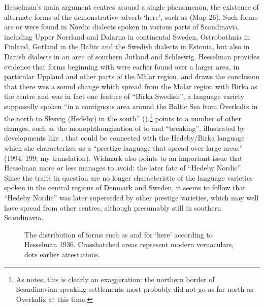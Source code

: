 Hesselman’s main argument centres around a single phenomenon, the existence of alternate forms of the demonstrative adverb  ‘here’, such as  (Map 26). Such forms are or were found in Nordic dialects spoken in various parts of Scandinavia, including Upper Norrland and Dalarna in continental Sweden, Ostrobothnia in Finland, Gotland in the Baltic and the Swedish dialects in Estonia, but also in Danish dialects in an area of southern Jutland and Schleswig. Hesselman provides evidence that forms beginning with  were earlier found over a larger area, in particular Uppland and other parts of the Mälar region, and draws the conclusion that there was a sound change  which spread from the Mälar region with Birka as the centre and was in fact one feature of “Birka Swedish”, a language variety supposedly spoken “in a contiguous area around the Baltic Sea from Överkalix in the north to Slesvig (Hedeby) in the south” (\citet[158]{Hesselman1936}).\footnote{ As \citet{Widmark1994} notes, this is clearly an exaggeration: the northern border of Scandinavian-speaking settlements most probably did not go as far north as Överkalix at this time.} \citet{Widmark1994} points to a number of other changes,  such as the monophthongization of  to and “breaking”, illustrated by developments like , that could be connected with the Hedeby/Birka language which she characterizes as a “prestige language that spread over large areas” (1994: 199; my translation). Widmark also points to an important issue that Hesselman more or less manages to avoid: the later fate of “Hedeby Nordic”. Since the traits in question are no longer characteristic of the language varieties spoken in the central regions of Denmark and Sweden, it seems to follow that “Hedeby Nordic” was later superseded by other prestige varieties, which may well have spread from other centres, although presumably still in southern Scandinavia. 







\begin{figure}[h]
 

\caption{The distribution of forms such as  and  for ‘here’ according to Hesselman 1936. Crosshatched areas represent modern vernaculars, dots earlier attestations.}
\label{map:6:26}
\end{figure}


